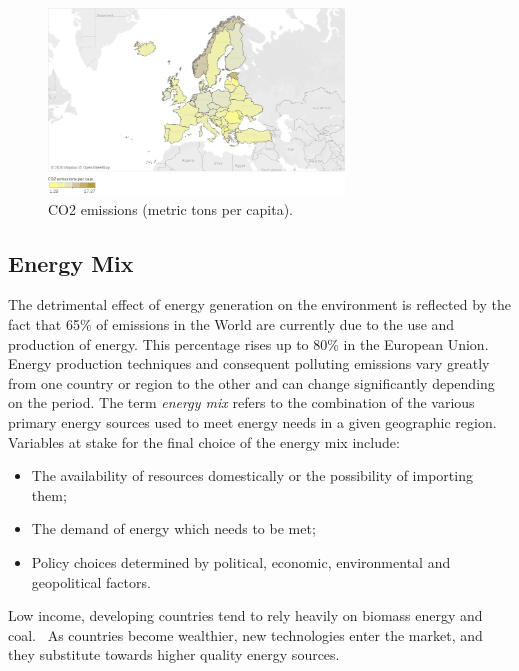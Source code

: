 \documentclass[a4paper,12pt]{book}
\begin{document}
\begin{figure}[tb]
\begin{center}
\captionsetup{justification=centering}
\includegraphics[width=0.7\textwidth]{Images/intensiti.png}
\caption{CO2 emissions (metric tons per capita).}
\label{fig:intensiti}
\end{center}
\end{figure}

\subsection*{Energy Mix}

The detrimental effect of energy generation on the environment is reflected by the fact that 65\% of emissions in the World are currently due to the use and production of energy. This percentage rises up to 80\% in the European Union.~\cite{marrero2010greenhouse} Energy production techniques and consequent polluting emissions vary greatly from one country or region to the other and can change significantly depending on the period. The term \textit{energy mix} refers to the combination of the various primary energy sources used to meet energy needs in a given geographic region. Variables at stake for the final choice of the energy mix include:

\begin{itemize}

\item The availability of resources domestically or the possibility of importing them;
\item The demand of energy which needs to be met;
\item Policy choices determined by political, economic, environmental and geopolitical factors.

\end{itemize}

Low income, developing countries tend to rely heavily on biomass energy and coal.~\cite{international2009energy} As countries become wealthier, new technologies enter the market, and they substitute towards higher quality energy sources.~\cite{csereklyei2016energy}
\end{document}
